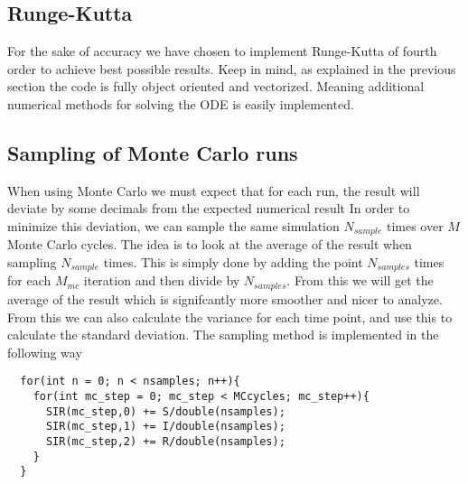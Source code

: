 \documentclass[a4paper, 10pt]{article}
\begin{document}
\subsection{Runge-Kutta} For the sake of accuracy we have chosen to implement Runge-Kutta
of fourth order to achieve best possible results. Keep in mind, as explained in the previous section
the code is fully object oriented and vectorized. Meaning additional numerical methods
for solving the ODE is easily implemented.
\subsection{Sampling of Monte Carlo runs} When using Monte Carlo we must expect that
for each run, the result will deviate by some decimals from the expected numerical result
In order to minimize this deviation,
we can sample the same simulation $N_{sample}$ times over $M$ Monte Carlo cycles.
The idea is to look at the average of the result when sampling
$N_{sample}$ times. This is simply done by adding the point $N_{samples}$ times for each
$M_{mc}$ iteration and then divide by $N_{samples}$. From this we will get the average of the result which is
signifcantly more smoother and nicer to analyze.
From this we can also calculate the variance for each time point, and use this
to calculate the standard deviation.  The sampling method is implemented in the following way
\begin{lstlisting}
  for(int n = 0; n < nsamples; n++){
    for(int mc_step = 0; mc_step < MCcycles; mc_step++){
      SIR(mc_step,0) += S/double(nsamples);
      SIR(mc_step,1) += I/double(nsamples);
      SIR(mc_step,2) += R/double(nsamples);
    }
  }
\end{lstlisting}
\end{document}
